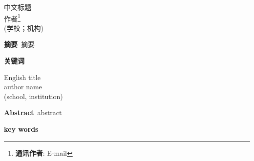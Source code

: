 \documentclass[10pt]{ctexart}
\begin{document}
\begin{center}
    \Large
    中文标题
    \\[10pt]
    \normalsize 
    作者\thanks{\noindent \textbf{通讯作者}: E-mail}
    \\[8pt]
    \small
    (学校；机构)
\end{center}

\noindent\textbf{摘要}\ 摘要

\noindent\textbf{关键词}\ 

\begin{center}
    \Large
    English title
    \\[10pt]
    \normalsize 
    author name
    \\[8pt]
    \small
    (school, institution)
\end{center}

\noindent\textbf{Abstract}\ abstract

\noindent\textbf{key words}\ 
\end{document}
